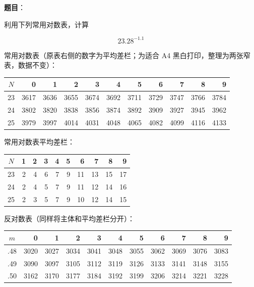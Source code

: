 \begin{answer}

\textbf{题目}：

利用下列常用对数表，计算

\nopagebreak[4]
\[
23.28^{-1.1}
\]

常用对数表（原表右侧的数字为平均差栏；为适合 A4 黑白打印，整理为两张窄表，数据不变）：

\scriptsize

\begin{center}
\begingroup\setlength{\tabcolsep}{4pt}
\begin{tabular}{crrrrrrrrrr}
\toprule
$N$ & 0 & 1 & 2 & 3 & 4 & 5 & 6 & 7 & 8 & 9 \\
\midrule
23 & 3617 & 3636 & 3655 & 3674 & 3692 & 3711 & 3729 & 3747 & 3766 & 3784 \\
24 & 3802 & 3820 & 3838 & 3856 & 3874 & 3892 & 3909 & 3927 & 3945 & 3962 \\
25 & 3979 & 3997 & 4014 & 4031 & 4048 & 4065 & 4082 & 4099 & 4116 & 4133 \\
\bottomrule
\end{tabular}
\endgroup
\end{center}

\normalsize

常用对数表平均差栏：

\scriptsize

\begin{center}
\begingroup\setlength{\tabcolsep}{4pt}
\begin{tabular}{crrrrrrrrr}
\toprule
$N$ & 1 & 2 & 3 & 4 & 5 & 6 & 7 & 8 & 9 \\
\midrule
23 & 2 & 4 & 6 & 7 & 9 & 11 & 13 & 15 & 17 \\
24 & 2 & 4 & 5 & 7 & 9 & 11 & 12 & 14 & 16 \\
25 & 2 & 3 & 5 & 7 & 9 & 10 & 12 & 14 & 15 \\
\bottomrule
\end{tabular}
\endgroup
\end{center}

\normalsize

反对数表（同样将主体和平均差栏分开）：

\scriptsize

\begin{center}
\begingroup\setlength{\tabcolsep}{4pt}
\begin{tabular}{crrrrrrrrrr}
\toprule
$m$ & 0 & 1 & 2 & 3 & 4 & 5 & 6 & 7 & 8 & 9 \\
\midrule
.48 & 3020 & 3027 & 3034 & 3041 & 3048 & 3055 & 3062 & 3069 & 3076 & 3083 \\
.49 & 3090 & 3097 & 3105 & 3112 & 3119 & 3126 & 3133 & 3141 & 3148 & 3155 \\
.50 & 3162 & 3170 & 3177 & 3184 & 3192 & 3199 & 3206 & 3214 & 3221 & 3228 \\
\bottomrule
\end{tabular}
\endgroup
\end{center}


\end{answer}
